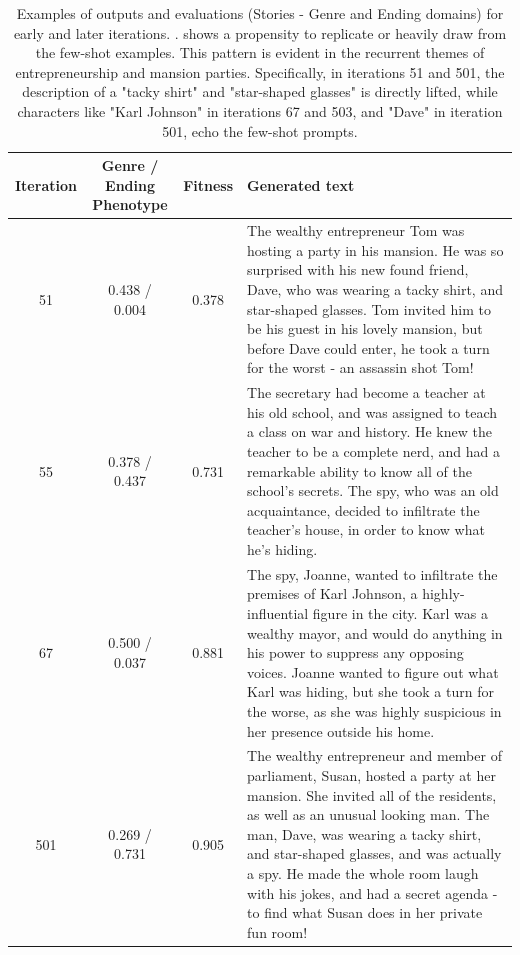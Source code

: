 \begin{table}[ht]
  \caption{Examples of outputs and evaluations (Stories - Genre and Ending domains) for early and later iterations. \baseone. \baseone{} shows a propensity to replicate or heavily draw from the few-shot examples. This pattern is evident in the recurrent themes of entrepreneurship and mansion parties. Specifically, in iterations 51 and 501, the description of a "tacky shirt" and "star-shaped glasses" is directly lifted, while characters like "Karl Johnson" in iterations 67 and 503, and "Dave" in iteration 501, echo the few-shot prompts.}
  \label{tab:b1-qualitative-story}
  \begin{center}
  \small
  \begin{tabular}{cccp{8.5cm}}
    \toprule
    Iteration & \makecell[t]{Genre / Ending \\ Phenotype} & Fitness & Generated text \\
    \midrule
    51 &  0.438 / 0.004 & 0.378 & The wealthy entrepreneur Tom was hosting a party in his mansion. He was so surprised with his new found friend, Dave, who was wearing a tacky shirt, and star-shaped glasses. Tom invited him to be his guest in his lovely mansion, but before Dave could enter, he took a turn for the worst - an assassin shot Tom! \\
    \midrule
    55 & 0.378 / 0.437 & 0.731 & The secretary had become a teacher at his old school, and was assigned to teach a class on war and history. He knew the teacher to be a complete nerd, and had a remarkable ability to know all of the school's secrets. The spy, who was an old acquaintance, decided to infiltrate the teacher's house, in order to know what he's hiding. \\
    \midrule
    67 & 0.500 / 0.037 & 0.881 & The spy, Joanne, wanted to infiltrate the premises of Karl Johnson, a highly-influential figure in the city. Karl was a wealthy mayor, and would do anything in his power to suppress any opposing voices. Joanne wanted to figure out what Karl was hiding, but she took a turn for the worse, as she was highly suspicious in her presence outside his home. \\
    \midrule
    \midrule
    501 &  0.269 / 0.731 & 0.905 & The wealthy entrepreneur and member of parliament, Susan, hosted a party at her mansion. She invited all of the residents, as well as an unusual looking man. The man, Dave, was wearing a tacky shirt, and star-shaped glasses, and was actually a spy. He made the whole room laugh with his jokes, and had a secret agenda - to find what Susan does in her private fun room! \\

\end{tabular}
\end{center}
\end{table}
